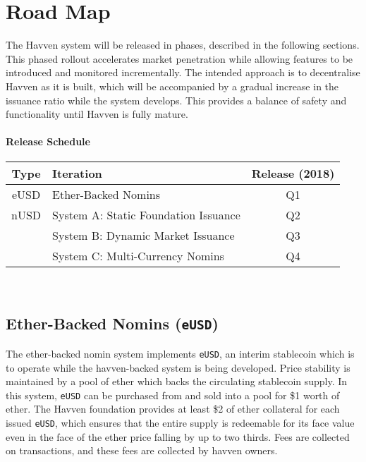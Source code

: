 \section{Road Map}

The Havven system will be released in phases, described in the following
sections. This phased rollout accelerates market penetration while
allowing features to be introduced and monitored incrementally. The intended approach  
is to decentralise Havven as it is built, which will be accompanied by a gradual
increase in the issuance ratio while the system develops.
This provides a balance of safety and functionality until Havven is fully
mature.

\paragraph{Release Schedule}
\renewcommand{\arraystretch}{1.5}
\setlength{\tabcolsep}{13pt}
\begin{centering}
    \begin{tabular}{|c|l|c|}
        \hline
        \textbf{Type} & \textbf{Iteration} & \textbf{Release (2018)} \\
        \hline
        \hline
        eUSD & Ether-Backed Nomins & Q1 \\
        \hline
        \hline
        nUSD & System A: Static Foundation Issuance & Q2 \\ \cline{2-3}
        & System B: Dynamic Market Issuance & Q3 \\ \cline{2-3}
        & System C: Multi-Currency Nomins& Q4 \\
        \hline
    \end{tabular} \\
\end{centering}
\vspace{0.5cm}

\subsection{Ether-Backed Nomins (\texttt{eUSD})}

\noindent The ether-backed nomin system implements \texttt{eUSD}, an interim stablecoin
which is to operate while the havven-backed system is being developed.
Price stability is maintained by a pool of ether which backs the circulating stablecoin
supply. In this system, \texttt{eUSD} can be purchased from and sold into a pool
for \$1 worth of ether. The Havven foundation provides at least \$2 of ether collateral
for each issued \texttt{eUSD}, which ensures that the entire supply is redeemable for its
face value even in the face of the ether price falling by up to two thirds. Fees are
collected on transactions, and these fees are collected by havven owners. \\

